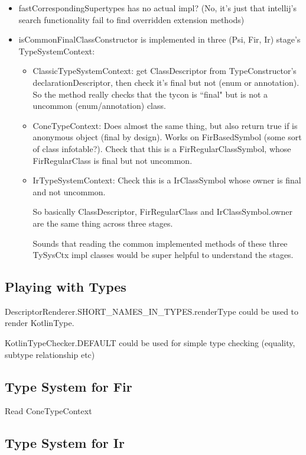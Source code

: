 \documentclass{article}
\begin{document}
\begin{itemize}
    \item fastCorrespondingSupertypes has no actual impl? (No, it's just that intellij's search functionality fail to find overridden extension methods)
    \item isCommonFinalClassConstructor is implemented in three (Psi, Fir, Ir) stage's TypeSystemContext:
    \begin{itemize}
        \item ClassicTypeSystemContext: get ClassDescriptor from TypeConstructor's declarationDescriptor, then check it's final but not (enum or annotation). So the method really checks that the tycon is ``final" but is not a uncommon (enum/annotation) class.
        \item ConeTypeContext: Does almost the same thing, but also return true if is anonymous object (final by design). Works on FirBasedSymbol (some sort of class infotable?). Check that this is a FirRegularClassSymbol, whose FirRegularClass is final but not uncommon.
        \item IrTypeSystemContext: Check this is a IrClassSymbol whose owner is final and not uncommon.

        So basically ClassDescriptor, FirRegularClass and IrClassSymbol.owner are the same thing across three stages.

        Sounds that reading the common implemented methods of these three TySysCtx impl classes would be super helpful to understand the stages.
    \end{itemize}
\end{itemize}

\subsection{Playing with Types}

DescriptorRenderer.SHORT\_NAMES\_IN\_TYPES.renderType could be used to render KotlinType.

KotlinTypeChecker.DEFAULT could be used for simple type checking (equality, subtype relationship etc)

\subsection{Type System for Fir}

Read ConeTypeContext

\subsection{Type System for Ir}
\end{document}

